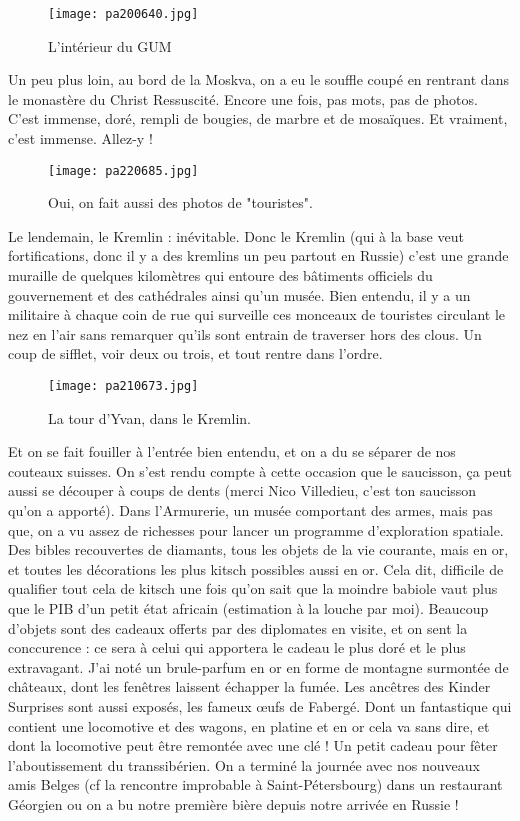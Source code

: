 \documentclass{book}
\begin{document}
\begin{figure}[h]
\centering
\texttt{[image: pa200640.jpg]}
\caption*{ L'intérieur du GUM}
\end{figure}

Un peu plus loin, au bord de la Moskva, on a eu le souffle coupé en rentrant dans le monastère du Christ Ressuscité. Encore une fois, pas mots, pas de photos. C'est immense, doré, rempli de bougies, de marbre et de mosaïques. Et vraiment, c'est immense. Allez-y !


\begin{figure}[h]
\centering
\texttt{[image: pa220685.jpg]}
\caption*{ Oui, on fait aussi des photos de "touristes".}
\end{figure}

Le lendemain, le Kremlin : inévitable. Donc le Kremlin (qui à la base veut fortifications, donc il y a des kremlins un peu partout en Russie) c'est une grande muraille de quelques kilomètres qui entoure des bâtiments officiels du gouvernement et des cathédrales ainsi qu'un musée. Bien entendu, il y a un militaire à chaque coin de rue qui surveille ces monceaux de touristes circulant le nez en l'air sans remarquer qu'ils sont entrain de traverser hors des clous. Un coup de sifflet, voir deux ou trois, et tout rentre dans l'ordre.


\begin{figure}[h]
\centering
\texttt{[image: pa210673.jpg]}
\caption*{ La tour d'Yvan, dans le Kremlin.}
\end{figure}

Et on se fait fouiller à l'entrée bien entendu, et on a du se séparer de nos couteaux suisses. On s'est rendu compte à cette occasion que le saucisson, ça peut aussi se découper à coups de dents (merci Nico Villedieu, c'est ton saucisson qu'on a apporté).
Dans l'Armurerie, un musée comportant des armes, mais pas que, on a vu assez de richesses pour lancer un programme d'exploration spatiale. Des bibles recouvertes de diamants, tous les objets de la vie courante, mais en or, et toutes les décorations les plus kitsch possibles aussi en or. Cela dit, difficile de qualifier tout cela de kitsch une fois qu'on sait que la moindre babiole vaut plus que le PIB d'un petit état africain (estimation à la louche par moi).
Beaucoup d'objets sont des cadeaux offerts par des diplomates en visite, et on sent la conccurence : ce sera à celui qui apportera le cadeau le plus doré et le plus extravagant. J'ai noté un brule-parfum en or en forme de montagne surmontée de châteaux, dont les fenêtres laissent échapper la fumée.
Les ancêtres des Kinder Surprises sont aussi exposés, les fameux œufs de Fabergé. Dont un fantastique qui contient une locomotive et des wagons, en platine et en or cela va sans dire, et dont la locomotive peut être remontée avec une clé ! Un petit cadeau pour fêter l'aboutissement du transsibérien.
On a terminé la journée avec nos nouveaux amis Belges (cf la rencontre improbable à Saint-Pétersbourg) dans un restaurant Géorgien ou on a bu notre première bière depuis notre arrivée en Russie !
\end{document}

